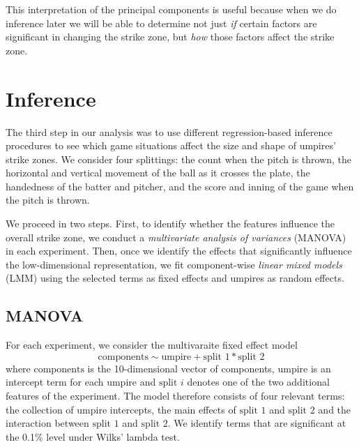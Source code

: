 \documentclass[letterpaper,12pt]{article}
\begin{document}
This interpretation of the principal components is useful because when we do inference later we will be able to determine not just \textit{if} certain factors are significant in changing the strike zone, but \textit{how} those factors affect the strike zone.

\section{Inference}\label{sec:inference}

The third step in our analysis was to use different regression-based inference procedures to see which game situations affect the size and shape of umpires' strike zones. 
We consider four splittings: the count when the pitch is thrown, the horizontal and vertical movement of the ball as it crosses the plate, the handedness of the batter and pitcher, and the score and inning of the game when the pitch is thrown.

We proceed in two steps. First, to identify whether the features influence the overall strike zone, we conduct a \textit{multivariate analysis of variances} (MANOVA) in each experiment. 
Then, once we identify the effects that significantly influence the low-dimensional representation, we fit component-wise \textit{linear mixed models} (LMM) using the selected terms as fixed effects and umpires as random effects. 

\subsection{MANOVA}\label{sec:MANOVA}

For each experiment, we consider the multivaraite fixed effect model
\[
    \text{components}
    \sim
    \text{umpire} + \text{split 1}*\text{split 2}
\]
where $\text{components}$ is the 10-dimensional vector of components, $\text{umpire}$ is an intercept term for each umpire and $\text{split }i$ denotes one of the two additional features of the experiment. 
The model therefore consists of four relevant terms: the collection of umpire intercepts, the main effects of $\text{split 1}$ and $\text{split 2}$ and the interaction between $\text{split 1}$ and $\text{split 2}$. 
We identify terms that are significant at the 0.1\% level under Wilks' lambda test.
\end{document}
